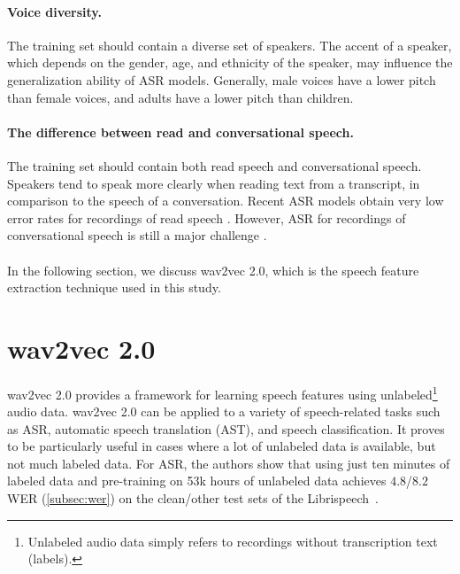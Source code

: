\paragraph*{Voice diversity.}
The training set should contain a diverse set of speakers.
The accent of a speaker, which depends on the gender, age, and ethnicity of the speaker, 
may influence the generalization ability of ASR models. 
Generally, male voices have a lower pitch than female voices, and adults have a lower pitch than children.

\paragraph*{The difference between read and conversational speech.}
The training set should contain both read speech and conversational speech.
Speakers tend to speak more clearly when reading text from a transcript, in comparison to the speech of a conversation.
Recent ASR models obtain very low error rates for recordings of read speech \cite{jurafskyspeech}.
However, ASR for recordings of conversational speech is still a major challenge \cite{jurafskyspeech}.
\\
\\
In the following section, we discuss wav2vec 2.0, which is the speech feature extraction technique used in this study.

\section{wav2vec 2.0}
wav2vec 2.0 provides a framework for learning speech features using unlabeled\footnote{Unlabeled audio data simply refers to recordings without transcription text (labels).} audio data.
wav2vec 2.0 can be applied to a variety of speech-related tasks such as ASR, automatic speech translation (AST),
and speech classification.
It proves to be particularly useful in cases where a lot of unlabeled data is available, but not much labeled data.
For ASR, the authors show that using just ten minutes of labeled data and pre-training
on 53k hours of unlabeled data achieves $4.8$/$8.2$ WER (\ref{subsec:wer}) on the clean/other test sets of the Librispeech~\cite{panayotov2015librispeech}.


